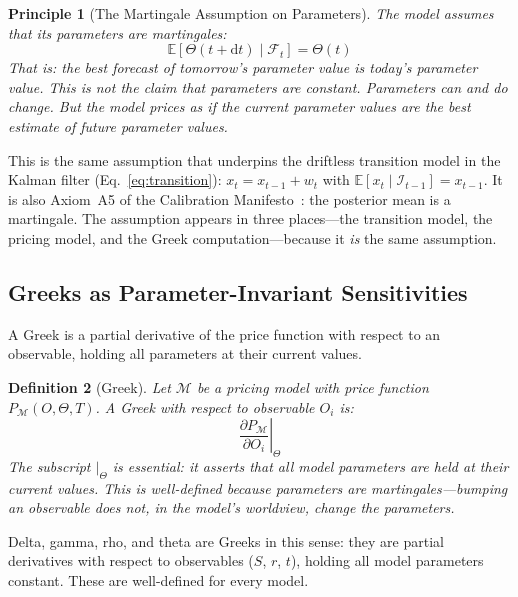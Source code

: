 \documentclass[11pt,a4paper]{article}
\newtheorem{definition}{Definition}[section]
\newtheorem{principle}[definition]{Principle}
\begin{document}
\begin{principle}[The Martingale Assumption on Parameters]
\label{princ:martingale-params}
The model assumes that its parameters are martingales:
\begin{equation}\label{eq:param-martingale}
\mathbb{E}[\Theta(t + \mathrm{d}t) \mid \mathcal{F}_t] = \Theta(t)
\end{equation}
That is: the best forecast of tomorrow's parameter value is today's parameter value.  This is \emph{not} the claim that parameters are constant.  Parameters can and do change.  But the model prices \emph{as if} the current parameter values are the best estimate of future parameter values.
\end{principle}

\noindent This is the same assumption that underpins the driftless transition model in the Kalman filter (Eq.~\ref{eq:transition}): $x_t = x_{t-1} + w_t$ with $\mathbb{E}[x_t \mid \mathcal{I}_{t-1}] = x_{t-1}$.  It is also Axiom~A5 of the Calibration Manifesto~\cite{calibration_manifesto}: the posterior mean is a martingale.  The assumption appears in three places---the transition model, the pricing model, and the Greek computation---because it \emph{is} the same assumption.

\subsection{Greeks as Parameter-Invariant Sensitivities}
\label{sec:greeks-invariant}

A Greek is a partial derivative of the price function with respect to an observable, holding all parameters at their current values.

\begin{definition}[Greek]
\label{def:greek}
Let $\mathcal{M}$ be a pricing model with price function $P_\mathcal{M}(O, \Theta, T)$.  A \emph{Greek} with respect to observable $O_i$ is:
\[
\left.\frac{\partial P_\mathcal{M}}{\partial O_i}\right|_{\Theta}
\]
The subscript $|_{\Theta}$ is essential: it asserts that all model parameters are held at their current values.  This is well-defined \emph{because} parameters are martingales---bumping an observable does not, in the model's worldview, change the parameters.
\end{definition}

\noindent Delta, gamma, rho, and theta are Greeks in this sense: they are partial derivatives with respect to observables ($S$, $r$, $t$), holding all model parameters constant.  These are well-defined for every model.
\end{document}
